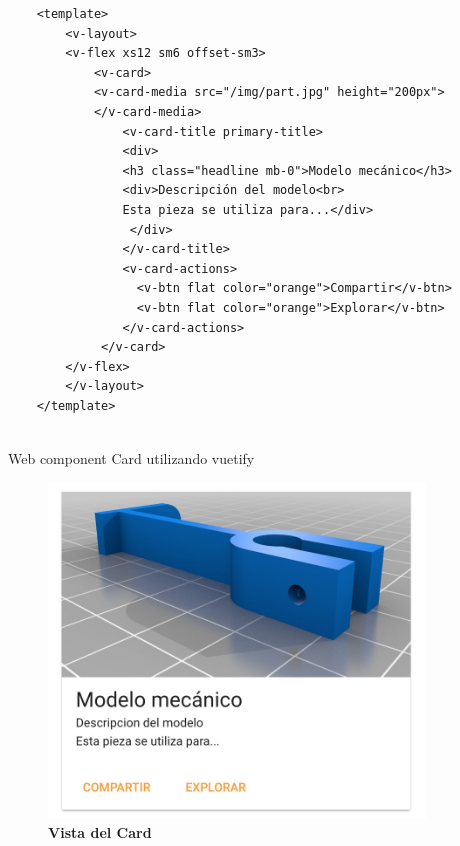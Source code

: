     \begin{verbatim}
    <template>
        <v-layout>
        <v-flex xs12 sm6 offset-sm3>
            <v-card>
            <v-card-media src="/img/part.jpg" height="200px">
            </v-card-media>
                <v-card-title primary-title>
                <div>
                <h3 class="headline mb-0">Modelo mecánico</h3>
                <div>Descripción del modelo<br>
                Esta pieza se utiliza para...</div>
                 </div>
                </v-card-title>
                <v-card-actions>
                  <v-btn flat color="orange">Compartir</v-btn>
                  <v-btn flat color="orange">Explorar</v-btn>
                </v-card-actions>
             </v-card>
        </v-flex>
        </v-layout>
    </template>


    \end{verbatim}
    \begin{center}
    \caption{Web component Card utilizando vuetify}
    \end{center}
    
    \begin{figure}[h]
    \includegraphics[width=10cm]{Img/Desarrollo/sistema4.jpg}
    \centering
    \caption{\textbf{ \footnotesize{Vista del Card}}}
    \label{fig:sistema4}
    \end{figure}
    
